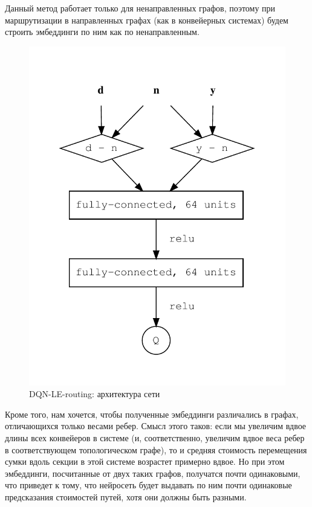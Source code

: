 \documentclass[specification,annotation,times]{itmo-student-thesis}
\theoremstyle{definition}
\begin{document}
Данный метод работает только для ненаправленных графов, поэтому при
маршрутизации в направленных графах (как в конвейерных системах) будем строить
эмбеддинги по ним как по ненаправленным.

\begin{figure}[!h]
  \caption{DQN-LE-routing: архитектура сети}\label{nn-1-one-out}
  \centering
  \includegraphics[scale=0.8]{nn-1-one-out}
\end{figure}

Кроме того, нам хочется, чтобы полученные эмбеддинги различались в графах,
отличающихся только весами ребер. Смысл этого таков: если мы увеличим вдвое
длины всех конвейеров в системе (и, соответственно, увеличим вдвое веса ребер в
соответствующем топологическом графе), то и средняя стоимость перемещения сумки
вдоль секции в этой системе возрастет примерно вдвое. Но при этом эмбеддинги,
посчитанные от двух таких графов, получатся почти одинаковыми, что приведет к
тому, что нейросеть будет выдавать по ним почти одинаковые предсказания
стоимостей путей, хотя они должны быть разными.
\end{document}
